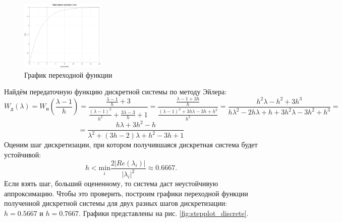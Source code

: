 \documentclass[a4paper]{article}
\renewcommand\min[1]{\underset{#1}{\text{min}}}
\begin{document}
\begin{figure}[H]
    \centering
    \includegraphics[width=0.356\textwidth]{sources/stepplot.png}
    \caption{График переходной функции}
    \label{fig:stepplot}
\end{figure}
Найдём передаточную функцию дискретной системы по методу Эйлера:
$$W_\text{д}(\lambda) = W_\text{н}\left( \frac{\lambda - 1}{h} \right) = \frac{\frac{\lambda - 1}{h} + 3}{\frac{(\lambda - 1)^2}{h^2} + \frac{3\lambda - 3}{h} + 1} = \frac{\frac{\lambda - 1 + 3h}{h}}{\frac{(\lambda - 1)^2 +3h\lambda - 3h + h^2}{h^2}} = \frac{h^2\lambda - h^2 + 3h^3}{h\lambda^2 - 2h\lambda + h + 3h^2\lambda - 3h^2 + h^3} =$$
$$= \frac{h\lambda + 3h^2 - h}{\lambda^2 + (3h - 2)\lambda + h^2 - 3h + 1}$$
Оценим шаг дискретизации, при котором получившаяся дискретная система будет устойчивой:
$$h < \min{i}\frac{2\left| Re(\lambda_i) \right|}{\left| \lambda_i \right|^2} \approx 0.6667.$$
Если взять шаг, больший оцененному, то система даст неустойчивую аппроксимацию. Чтобы это проверить, построим графики переходной функции полученной дискретной системы для двух разных шагов дискретизации: $h = 0.5667$ и $h = 0.7667$. Графики представлены на рис. \ref{fig:stepplot_discrete}.
\end{document}

